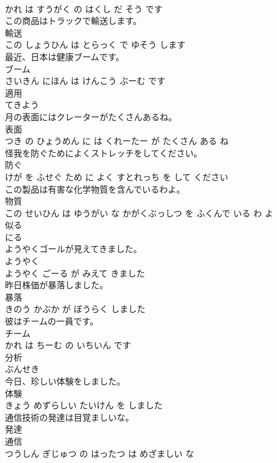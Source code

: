 \documentclass[8pt]{extreport}
\begin{document}
\begin{CJK}{UTF8}{min}
\\	かれ は すうがく の はくし だ そう です			
\\	この商品はトラックで輸送します。	
\\	輸送 
\\	この しょうひん は とらっく で ゆそう します			
\\	最近、日本は健康ブームです。	
\\	ブーム 
\\	さいきん にほん は けんこう ぶーむ です			
\\	適用	
\\	てきよう			
\\	月の表面にはクレーターがたくさんあるね。	
\\	表面 
\\	つき の ひょうめん に は くれーたー が たくさん ある ね			
\\	怪我を防ぐためによくストレッチをしてください。	
\\	防ぐ 
\\	けが を ふせぐ ため に よく すとれっち を して ください			
\\	この製品は有害な化学物質を含んでいるわよ。	
\\	物質 
\\	この せいひん は ゆうがい な かがくぶっしつ を ふくんで いる わ よ			
\\	似る	
\\	にる			
\\	ようやくゴールが見えてきました。	
\\	ようやく 
\\	ようやく ごーる が みえて きました			
\\	昨日株価が暴落しました。	
\\	暴落 
\\	きのう かぶか が ぼうらく しました			
\\	彼はチームの一員です。	
\\	チーム 
\\	かれ は ちーむ の いちいん です			
\\	分析	
\\	ぶんせき			
\\	今日、珍しい体験をしました。	
\\	体験 
\\	きょう めずらしい たいけん を しました			
\\	通信技術の発達は目覚ましいな。	
\\	発達 
\\	通信 
\\	つうしん ぎじゅつ の はったつ は めざましい な			

\end{CJK}
\end{document}
